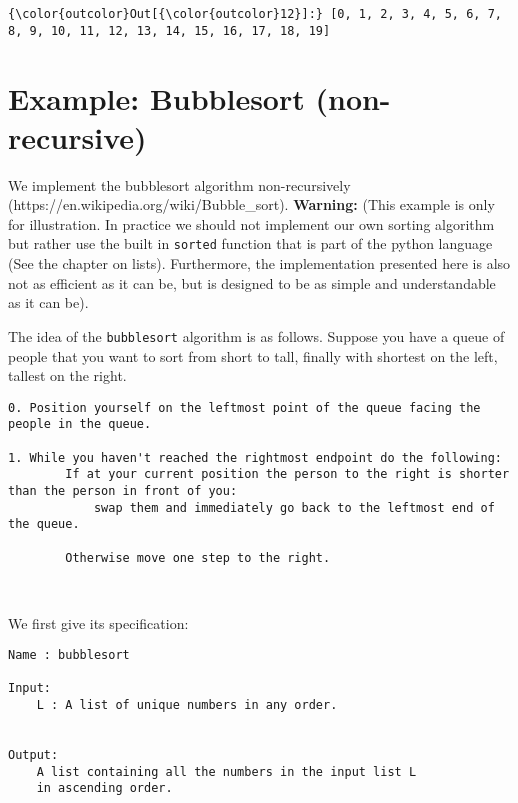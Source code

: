 \documentclass{report}
\begin{document}
\begin{Verbatim}[commandchars=\\\{\}]
{\color{outcolor}Out[{\color{outcolor}12}]:} [0, 1, 2, 3, 4, 5, 6, 7, 8, 9, 10, 11, 12, 13, 14, 15, 16, 17, 18, 19]
\end{Verbatim}
            
\section{Example: Bubblesort
(non-recursive)}\label{example-bubblesort-non-recursive}

We implement the bubblesort algorithm non-recursively
(https://en.wikipedia.org/wiki/Bubble\_sort). \textbf{Warning:} (This
example is only for illustration. In practice we should not implement
our own sorting algorithm but rather use the built in \texttt{sorted}
function that is part of the python language (See the chapter on lists).
Furthermore, the implementation presented here is also not as efficient
as it can be, but is designed to be as simple and understandable as it
can be).

The idea of the \texttt{bubblesort} algorithm is as follows. Suppose you
have a queue of people that you want to sort from short to tall, finally
with shortest on the left, tallest on the right.

\begin{verbatim}
0. Position yourself on the leftmost point of the queue facing the people in the queue.

1. While you haven't reached the rightmost endpoint do the following:
        If at your current position the person to the right is shorter than the person in front of you:
            swap them and immediately go back to the leftmost end of the queue.
    
        Otherwise move one step to the right.
    
   
\end{verbatim}

We first give its specification:

\begin{verbatim}
Name : bubblesort

Input:
    L : A list of unique numbers in any order.
    
    
Output:
    A list containing all the numbers in the input list L
    in ascending order.
    
    

        
\end{verbatim}
\end{document}
